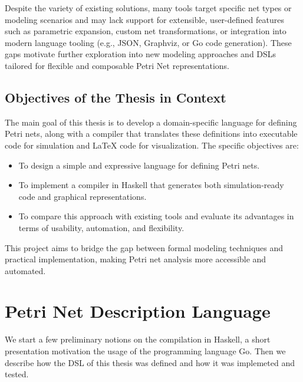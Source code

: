 \documentclass[12pt]{article}
\begin{document}
        Despite the variety of existing solutions, many tools target specific net types or modeling scenarios and may lack support for extensible, user-defined features such as parametric expansion, custom net transformations, or integration into modern language tooling (e.g., JSON, Graphviz, or Go code generation). These gaps motivate further exploration into new modeling approaches and DSLs tailored for flexible and composable Petri Net representations.


    \subsection{Objectives of the Thesis in Context}
    The main goal of this thesis is to develop a domain-specific language for defining Petri nets, along with a compiler that translates these definitions into executable code for simulation and LaTeX code for visualization. The specific objectives are:
    \begin{itemize}
        \item To design a simple and expressive language for defining Petri nets.
        \item To implement a compiler in Haskell that generates both simulation-ready code and graphical representations.
        \item To compare this approach with existing tools and evaluate its advantages in terms of usability, automation, and flexibility.
    \end{itemize}
    This project aims to bridge the gap between formal modeling techniques and practical implementation, making Petri net analysis more accessible and automated.
    
\section{Petri Net Description Language}
    We start a few preliminary notions on the compilation in Haskell, a short presentation motivation the usage of the programming language Go.
    Then we describe how the DSL of this thesis was defined and how it was implemeted and tested.
\end{document}
